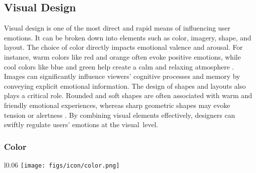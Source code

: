 \subsection{Visual Design}
Visual design is one of the most direct and rapid means of influencing user emotions. It can be broken down into elements such as color, imagery, shape, and layout. The choice of color directly impacts emotional valence and arousal. For instance, warm colors like red and orange often evoke positive emotions, while cool colors like blue and green help create a calm and relaxing atmosphere \cite{plass2014emotional}. Images can significantly influence viewers’ cognitive processes and memory by conveying explicit emotional information. The design of shapes and layouts also plays a critical role. Rounded and soft shapes are often associated with warm and friendly emotional experiences, whereas sharp geometric shapes may evoke tension or alertness \cite{mayer2014benefits}. By combining visual elements effectively, designers can swiftly regulate users’ emotions at the visual~level.




\subsubsection{Color}
\begin{wrapfigure}{l}{0.06\textwidth}
  \vspace{-11pt} %
        \texttt{[image: figs/icon/color.png]}
\end{wrapfigure} 

